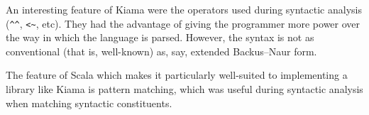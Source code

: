 \documentclass[a4paper]{article}
\begin{document}
\begin{enumerate}
		An interesting feature of Kiama were the operators used during syntactic analysis (\verb=^^=, \verb=<~=, etc). They had the advantage of giving the programmer more power over the way in which the language is parsed. However, the syntax is not as conventional (that is, well-known) as, say, extended Backus--Naur form.
		
		The feature of Scala which makes it particularly well-suited to implementing a library like Kiama is pattern matching, which was useful during syntactic analysis when matching syntactic constituents.
	\end{enumerate}
\end{document}
